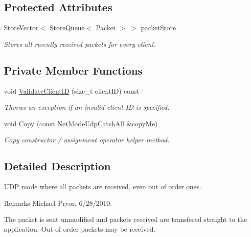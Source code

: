 \subsection*{Protected Attributes}
\begin{DoxyCompactItemize}
\item 
\hypertarget{class_net_mode_udp_catch_all_a2eba04c6f0b36531765db21858d96c54}{
\hyperlink{class_store_vector}{StoreVector}$<$ \hyperlink{class_store_queue}{StoreQueue}$<$ \hyperlink{class_packet}{Packet} $>$ $>$ \hyperlink{class_net_mode_udp_catch_all_a2eba04c6f0b36531765db21858d96c54}{packetStore}}
\label{class_net_mode_udp_catch_all_a2eba04c6f0b36531765db21858d96c54}

\begin{DoxyCompactList}\small\item\em Stores all recently received packets for every client. \item\end{DoxyCompactList}\end{DoxyCompactItemize}
\subsection*{Private Member Functions}
\begin{DoxyCompactItemize}
\item 
void \hyperlink{class_net_mode_udp_catch_all_a27195f4faaf7bb96e1f216cf1531950e}{ValidateClientID} (size\_\-t clientID) const 
\begin{DoxyCompactList}\small\item\em Throws an exception if an invalid client ID is specified. \item\end{DoxyCompactList}\item 
void \hyperlink{class_net_mode_udp_catch_all_ab6c440044e5e6fae6127998c05c9fc08}{Copy} (const \hyperlink{class_net_mode_udp_catch_all}{NetModeUdpCatchAll} \&copyMe)
\begin{DoxyCompactList}\small\item\em Copy constructor / assignment operator helper method. \item\end{DoxyCompactList}\end{DoxyCompactItemize}


\subsection{Detailed Description}
UDP mode where all packets are received, even out of order ones. \begin{DoxyRemark}{Remarks}
Michael Pryor, 6/28/2010.
\end{DoxyRemark}
The packet is sent unmodified and packets received are transfered straight to the application. Out of order packets may be received.\par
\par


